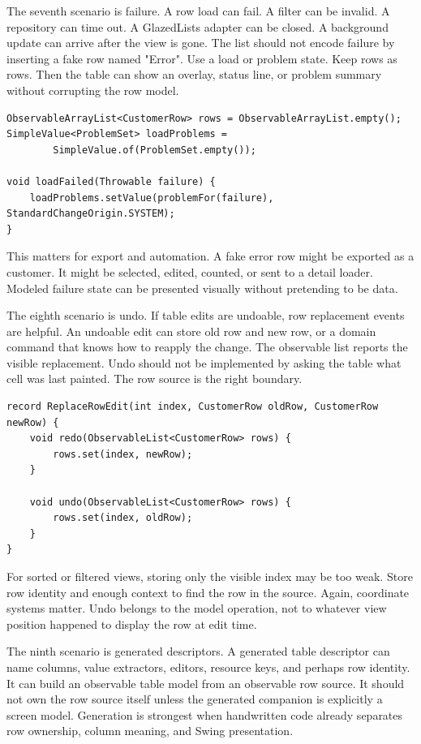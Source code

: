 The seventh scenario is failure. A row load can fail. A filter can be invalid.
A repository can time out. A GlazedLists adapter can be closed. A background
update can arrive after the view is gone. The list should not encode failure by
inserting a fake row named "Error". Use a load or problem state. Keep rows as
rows. Then the table can show an overlay, status line, or problem summary
without corrupting the row model.

\begin{lstlisting}[caption={Failure is state beside the rows, not a fake row.}]
ObservableArrayList<CustomerRow> rows = ObservableArrayList.empty();
SimpleValue<ProblemSet> loadProblems =
        SimpleValue.of(ProblemSet.empty());

void loadFailed(Throwable failure) {
    loadProblems.setValue(problemFor(failure), StandardChangeOrigin.SYSTEM);
}
\end{lstlisting}

This matters for export and automation. A fake error row might be exported as a
customer. It might be selected, edited, counted, or sent to a detail loader.
Modeled failure state can be presented visually without pretending to be data.

The eighth scenario is undo. If table edits are undoable, row replacement events
are helpful. An undoable edit can store old row and new row, or a domain command
that knows how to reapply the change. The observable list reports the visible
replacement. Undo should not be implemented by asking the table what cell was
last painted. The row source is the right boundary.

\begin{lstlisting}[caption={Undoable row replacement records model facts.}]
record ReplaceRowEdit(int index, CustomerRow oldRow, CustomerRow newRow) {
    void redo(ObservableList<CustomerRow> rows) {
        rows.set(index, newRow);
    }

    void undo(ObservableList<CustomerRow> rows) {
        rows.set(index, oldRow);
    }
}
\end{lstlisting}

For sorted or filtered views, storing only the visible index may be too weak.
Store row identity and enough context to find the row in the source. Again,
coordinate systems matter. Undo belongs to the model operation, not to whatever
view position happened to display the row at edit time.

The ninth scenario is generated descriptors. A generated table descriptor can
name columns, value extractors, editors, resource keys, and perhaps row identity.
It can build an observable table model from an observable row source. It should
not own the row source itself unless the generated companion is explicitly a
screen model. Generation is strongest when handwritten code already separates
row ownership, column meaning, and Swing presentation.

